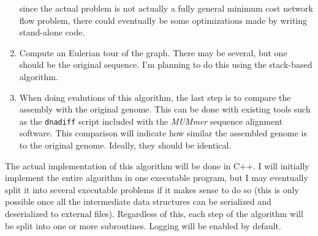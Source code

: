 \documentclass[letterpaper,12pt]{article}
\begin{document}
\begin{enumerate}
since the actual problem is not actually a fully general minimum cost network
flow problem, there could eventually be some optimizations made by writing
stand-alone code.
\item Compute an Eulerian tour of the graph.  There may be several, but one
should be the original sequence.  I'm planning to do this using the stack-based
algorithm.
\item When doing evalutions of this algorithm, the last step is to compare the
assembly with the original genome.  This can be done with existing tools such as
the {\tt dnadiff} script included with the {\em MUMmer} sequence alignment
software.  This comparison will indicate how similar the assembled genome is to
the original genome.  Ideally, they should be identical.
\end{enumerate}

The actual implementation of this algorithm will be done in C++.  I will
initially implement the entire algorithm in one executable program, but I may
eventually split it into several executable problems if it makes sense to do so
(this is only possible once all the intermediate data structures can be
serialized and deserialized to external files).  Regardless of this, each step
of the algorithm will be split into one or more subroutines.  Logging will be
enabled by default.
\end{document}
